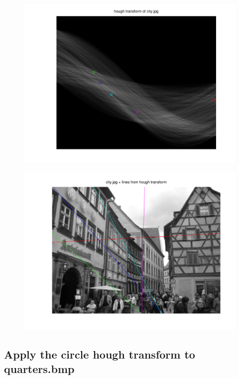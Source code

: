 \documentclass{article}
\begin{document}
	\begin{figure}[H]
		\includegraphics[width=\linewidth]{Q6/partA1.png}
	\end{figure}
	\begin{figure}[H]
		\includegraphics[width=\linewidth]{Q6/partA2.png}
	\end{figure}
	
	\newpage
	\subsection{Apply the circle hough transform to quarters.bmp}
	
\end{document}
